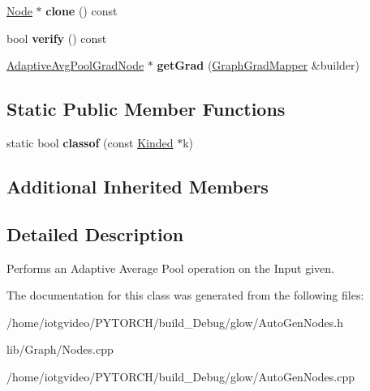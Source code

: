 \begin{DoxyCompactItemize}
\hyperlink{classglow_1_1_node}{Node} $\ast$ {\bfseries clone} () const
\item 
\mbox{\label{classglow_1_1_adaptive_avg_pool_node_a9d25aa40fd8b4c3b51b1a999c8c83ab4}} 
bool {\bfseries verify} () const
\item 
\mbox{\label{classglow_1_1_adaptive_avg_pool_node_a78163c45ecc424988ff66a4ba02c6fb8}} 
\hyperlink{classglow_1_1_adaptive_avg_pool_grad_node}{Adaptive\+Avg\+Pool\+Grad\+Node} $\ast$ {\bfseries get\+Grad} (\hyperlink{classglow_1_1_graph_grad_mapper}{Graph\+Grad\+Mapper} \&builder)
\end{DoxyCompactItemize}
\subsection*{Static Public Member Functions}
\begin{DoxyCompactItemize}
\item 
\mbox{\label{classglow_1_1_adaptive_avg_pool_node_a9945cc08a10480233dfb9f381c093437}} 
static bool {\bfseries classof} (const \hyperlink{classglow_1_1_kinded}{Kinded} $\ast$k)
\end{DoxyCompactItemize}
\subsection*{Additional Inherited Members}


\subsection{Detailed Description}
Performs an Adaptive Average Pool operation on the Input given. 

The documentation for this class was generated from the following files\+:\begin{DoxyCompactItemize}
\item 
/home/iotgvideo/\+P\+Y\+T\+O\+R\+C\+H/build\+\_\+\+Debug/glow/Auto\+Gen\+Nodes.\+h\item 
lib/\+Graph/Nodes.\+cpp\item 
/home/iotgvideo/\+P\+Y\+T\+O\+R\+C\+H/build\+\_\+\+Debug/glow/Auto\+Gen\+Nodes.\+cpp\end{DoxyCompactItemize}
